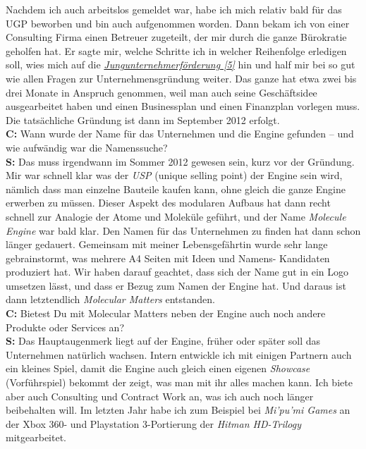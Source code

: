 \documentclass[10pt,a4paper,ngerman,twoside]{article} %
\begin{document}
Nachdem ich auch arbeitslos gemeldet war, habe ich mich relativ bald für das UGP beworben und bin auch aufgenommen worden. Dann bekam ich von einer Consulting Firma einen Betreuer zugeteilt, der mir durch die ganze Bürokratie geholfen hat. Er sagte mir, welche Schritte ich in welcher Reihenfolge erledigen soll, wies mich auf die \href{https://www.gruenderservice.at/Content.Node/gruenden/Jungunternehmerfoerderungen.html}{\textit{Jungunternehmerförderung [5]}} hin und half mir bei so gut wie allen Fragen zur Unternehmensgründung weiter. Das ganze hat etwa zwei bis drei Monate in Anspruch genommen, weil man auch seine Geschäftsidee ausgearbeitet haben und einen Businessplan und einen Finanzplan vorlegen muss. Die tatsächliche Gründung ist dann im September 2012 erfolgt. \\
\textbf{C:} Wann wurde der Name für das Unternehmen und die Engine gefunden – und wie aufwändig war die Namenssuche? \\
\textbf{S:} Das muss irgendwann im Sommer 2012 gewesen sein, kurz vor der Gründung. Mir war schnell klar was der \textit{USP} (unique selling point) der Engine sein wird, nämlich dass man einzelne Bauteile kaufen kann, ohne gleich die ganze Engine erwerben zu müssen. Dieser Aspekt des modularen Aufbaus hat dann recht schnell zur Analogie der Atome und Moleküle geführt, und der Name \textit{Molecule Engine} war bald klar. Den Namen für das Unternehmen zu finden hat dann schon länger gedauert. Gemeinsam mit meiner Lebensgefährtin wurde sehr lange gebrainstormt, was mehrere A4 Seiten mit Ideen und Namens- Kandidaten produziert hat. Wir haben darauf geachtet, dass sich der Name gut in ein Logo umsetzen lässt, und dass er Bezug zum Namen der Engine hat. Und daraus ist dann letztendlich \textit{Molecular Matters} entstanden. \\
\textbf{C:} Bietest Du mit Molecular Matters neben der Engine auch noch andere Produkte oder Services an? \\
\textbf{S:} Das Hauptaugenmerk liegt auf der Engine, früher oder später soll das Unternehmen natürlich wachsen. Intern entwickle ich mit einigen Partnern auch ein kleines Spiel, damit die Engine auch gleich einen eigenen \textit{Showcase} (Vorführspiel) bekommt der zeigt, was man mit ihr alles machen kann. Ich biete aber auch Consulting und Contract Work an, was ich auch noch länger beibehalten will. Im letzten Jahr habe ich zum Beispiel bei \textit{Mi’pu’mi Games} an der Xbox 360- und Playstation 3-Portierung der \textit{Hitman HD-Trilogy} mitgearbeitet.
\end{document}

